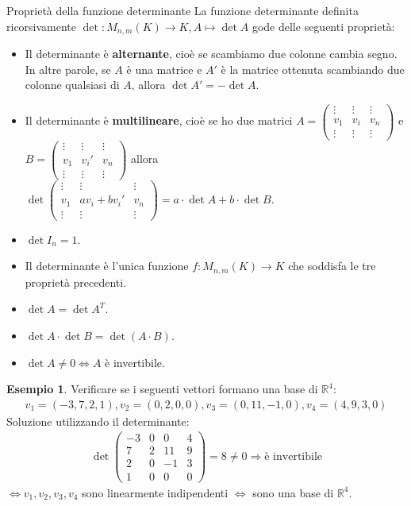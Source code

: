 \documentclass[a4paper]{article}
\theoremstyle{definition}
\newtheorem*{es}{Esempio}
\begin{document}
\begin{teo}{Proprietà della funzione determinante}{}
	La funzione determinante definita ricorsivamente $\det: M_{n,m}(K) \rightarrow K, A \mapsto \det A$ gode delle seguenti proprietà:
	\begin{itemize}
		\item Il determinante è \textbf{alternante}, cioè se scambiamo due colonne cambia segno.
		      In altre parole, se $A$ è una matrice e $A'$ è la matrice ottenuta scambiando due colonne qualsiasi di $A$, allora $\det A' = - \det A$.
		\item Il determinante è \textbf{multilineare}, cioè se ho due matrici $A = \begin{pmatrix}
				      \vdots & \vdots & \vdots \\
				      v_1    & v_i    & v_n    \\
				      \vdots & \vdots & \vdots
			      \end{pmatrix}$ e $B = \begin{pmatrix}
				      \vdots & \vdots & \vdots \\
				      v_1    & v_i'   & v_n    \\
				      \vdots & \vdots & \vdots
			      \end{pmatrix}$ allora $\det \begin{pmatrix}
				      \vdots & \vdots       & \vdots \\
				      v_1    & av_i + bv_i' & v_n    \\
				      \vdots & \vdots       & \vdots
			      \end{pmatrix} = a \cdot \det A + b \cdot \det B$.
		\item $\det I_n = 1$.
		\item Il determinante è l'unica funzione $f: M_{n,m}(K) \rightarrow K$ che soddisfa le tre proprietà precedenti.
		\item $\det A = \det A^T$.
		\item $\det A \cdot \det B = \det(A \cdot B)$.
		\item $\det A \ne 0 \Leftrightarrow A$ è invertibile.
	\end{itemize}
\end{teo}
\begin{es}
	Verificare se i seguenti vettori formano una base di $\mathbb{R}^4$:
	\begin{align*}
		v_1 = ( - 3, 7, 2, 1), v_2 = (0, 2, 0, 0), v_3 = (0, 11, - 1, 0), v_4 = (4, 9, 3, 0)
	\end{align*}
	Soluzione utilizzando il determinante:
	\begin{align*}
		\det \begin{pmatrix}
			     - 3 & 0 & 0   & 4 \\
			     7   & 2 & 11  & 9 \\
			     2   & 0 & - 1 & 3 \\
			     1   & 0 & 0   & 0
		     \end{pmatrix} = 8 \ne 0 \Rightarrow \text{è invertibile}
	\end{align*}
	$\Leftrightarrow v_1, v_2, v_3, v_4$ sono linearmente indipendenti $\Leftrightarrow$ sono una base di $\mathbb{R}^4$.
\end{es}
\end{document}
